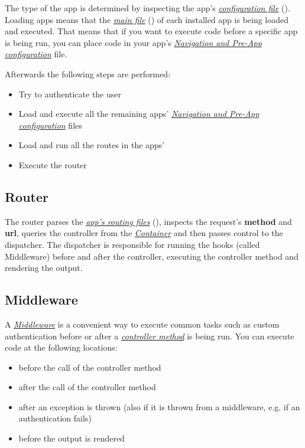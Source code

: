 \documentclass[letterpaper,10pt,english]{sphinxmanual}
\begin{document}
The type of the app is determined by inspecting the app's {\hyperref[app/info::doc]{\emph{configuration file}}} (). Loading apps means that the {\hyperref[app/init::doc]{\emph{main file}}} () of each installed app is being loaded and executed. That means that if you want to execute code before a specific app is being run, you can place code in your app's {\hyperref[app/init::doc]{\emph{Navigation and Pre-App configuration}}} file.

Afterwards the following steps are performed:
\begin{itemize}
\item {} 
Try to authenticate the user

\item {} 
Load and execute all the remaining apps' {\hyperref[app/init::doc]{\emph{Navigation and Pre-App configuration}}} files

\item {} 
Load and run all the routes in the apps' 

\item {} 
Execute the router

\end{itemize}


\subsection{Router}
\label{app/request:router}
The router parses the {\hyperref[app/routes::doc]{\emph{app's routing files}}} (), inspects the request's \textbf{method} and \textbf{url}, queries the controller from the {\hyperref[app/container::doc]{\emph{Container}}} and then passes control to the dispatcher. The dispatcher is responsible for running the hooks (called Middleware) before and after the controller, executing the controller method and rendering the output.


\subsection{Middleware}
\label{app/request:middleware}
A {\hyperref[app/middleware::doc]{\emph{Middleware}}} is a convenient way to execute common tasks such as custom authentication before or after a {\hyperref[app/controllers::doc]{\emph{controller method}}} is being run. You can execute code at the following locations:
\begin{itemize}
\item {} 
before the call of the controller method

\item {} 
after the call of the controller method

\item {} 
after an exception is thrown (also if it is thrown from a middleware, e.g. if an authentication fails)

\item {} 
before the output is rendered

\end{itemize}
\end{document}
